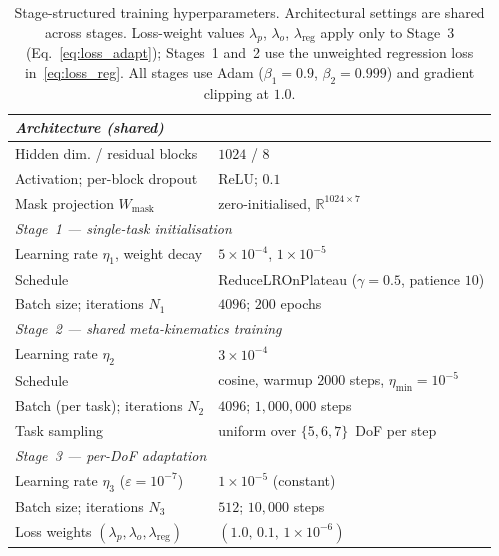 \documentclass[conference]{IEEEtran}
\begin{document}
\begin{table}[!t]
\renewcommand{\arraystretch}{1.05}
\caption{Stage-structured training hyperparameters. Architectural settings are shared across stages. Loss-weight values $\lambda_p$, $\lambda_o$, $\lambda_{\mathrm{reg}}$ apply only to Stage~3 (Eq.~\ref{eq:loss_adapt}); Stages~1 and~2 use the unweighted regression loss in~\eqref{eq:loss_reg}. All stages use Adam ($\beta_1=0.9$, $\beta_2=0.999$) and gradient clipping at $1.0$.}
\label{tab:hparams}
\centering
\footnotesize
\begin{tabular}{ll}
\toprule
\multicolumn{2}{l}{\textit{Architecture (shared)}} \\
\midrule
Hidden dim. / residual blocks & $1024$ / $8$ \\
Activation; per-block dropout & ReLU; $0.1$ \\
Mask projection $W_{\mathrm{mask}}$ & zero-initialised, $\mathbb{R}^{1024 \times 7}$ \\
\midrule
\multicolumn{2}{l}{\textit{Stage~1 — single-task initialisation}} \\
\midrule
Learning rate $\eta_1$, weight decay & $5\times10^{-4}$, $1\times10^{-5}$ \\
Schedule & ReduceLROnPlateau ($\gamma=0.5$, patience $10$) \\
Batch size; iterations $N_1$ & $4096$; $200$ epochs \\
\midrule
\multicolumn{2}{l}{\textit{Stage~2 — shared meta-kinematics training}} \\
\midrule
Learning rate $\eta_2$ & $3\times10^{-4}$ \\
Schedule & cosine, warmup $2000$ steps, $\eta_{\min}=10^{-5}$ \\
Batch (per task); iterations $N_2$ & $4096$; $1{,}000{,}000$ steps \\
Task sampling & uniform over $\{5, 6, 7\}$~DoF per step \\
\midrule
\multicolumn{2}{l}{\textit{Stage~3 — per-DoF adaptation}} \\
\midrule
Learning rate $\eta_3$ ($\varepsilon=10^{-7}$) & $1\times10^{-5}$ (constant) \\
Batch size; iterations $N_3$ & $512$; $10{,}000$ steps \\
Loss weights $(\lambda_p, \lambda_o, \lambda_{\mathrm{reg}})$ & $(1.0,\, 0.1,\, 1\times10^{-6})$ \\
\bottomrule
\end{tabular}
\end{table}
\end{document}
